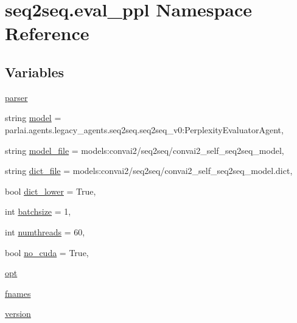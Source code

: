 \hypertarget{namespaceseq2seq_1_1eval__ppl}{}\section{seq2seq.\+eval\+\_\+ppl Namespace Reference}
\label{namespaceseq2seq_1_1eval__ppl}
\subsection*{Variables}
\begin{DoxyCompactItemize}
\item 
\hyperlink{namespaceseq2seq_1_1eval__ppl_af74afb56980c3fda3ba6bba37ef8605c}{parser}
\item 
string \hyperlink{namespaceseq2seq_1_1eval__ppl_a7894e8b2693db6cfe74e06b0ac615510}{model} = \textquotesingle{}parlai.\+agents.\+legacy\+\_\+agents.\+seq2seq.\+seq2seq\+\_\+v0\+:\+Perplexity\+Evaluator\+Agent\textquotesingle{},
\item 
string \hyperlink{namespaceseq2seq_1_1eval__ppl_aff409caa6df192230a92fa5a1579af16}{model\+\_\+file} = \textquotesingle{}models\+:convai2/seq2seq/convai2\+\_\+self\+\_\+seq2seq\+\_\+model\textquotesingle{},
\item 
string \hyperlink{namespaceseq2seq_1_1eval__ppl_a325bafd57fb8a3b903b4beb6c4e7da9b}{dict\+\_\+file} = \textquotesingle{}models\+:convai2/seq2seq/convai2\+\_\+self\+\_\+seq2seq\+\_\+model.\+dict\textquotesingle{},
\item 
bool \hyperlink{namespaceseq2seq_1_1eval__ppl_a120caca6e8b30207fbb98018fb2facc6}{dict\+\_\+lower} = True,
\item 
int \hyperlink{namespaceseq2seq_1_1eval__ppl_a38eee58d678ac8aecb2e7e6ff93aad81}{batchsize} = 1,
\item 
int \hyperlink{namespaceseq2seq_1_1eval__ppl_a840de4f68945f1b4e057b08c3b0451a8}{numthreads} = 60,
\item 
bool \hyperlink{namespaceseq2seq_1_1eval__ppl_a35cdce8cb16bbedaddb40af9a0250505}{no\+\_\+cuda} = True,
\item 
\hyperlink{namespaceseq2seq_1_1eval__ppl_ac9aef8e1b7b3bdebb8796c357f2b106d}{opt}
\item 
\hyperlink{namespaceseq2seq_1_1eval__ppl_acfe94383616d9824aa2f479f2cd9dc8d}{fnames}
\item 
\hyperlink{namespaceseq2seq_1_1eval__ppl_a5ce98aa272398ba396f59de6da776cbe}{version}
\end{DoxyCompactItemize}


